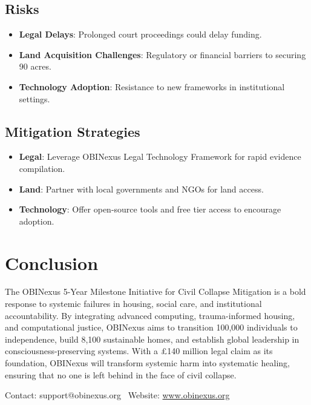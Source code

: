 \documentclass[12pt]{article}\usepackage[a4paper,margin=1in]{geometry}
\begin{document}
\subsection*{Risks}
\begin{itemize}
    \item \textbf{Legal Delays}: Prolonged court proceedings could delay funding.
    \item \textbf{Land Acquisition Challenges}: Regulatory or financial barriers to securing 90 acres.
    \item \textbf{Technology Adoption}: Resistance to new frameworks in institutional settings.
\end{itemize}\subsection*{Mitigation Strategies}
\begin{itemize}
    \item \textbf{Legal}: Leverage OBINexus Legal Technology Framework for rapid evidence compilation.
    \item \textbf{Land}: Partner with local governments and NGOs for land access.
    \item \textbf{Technology}: Offer open-source tools and free tier access to encourage adoption.
\end{itemize}\section*{Conclusion}
The OBINexus 5-Year Milestone Initiative for Civil Collapse Mitigation is a bold response to systemic failures in housing, social care, and institutional accountability. By integrating advanced computing, trauma-informed housing, and computational justice, OBINexus aims to transition 100,000 individuals to independence, build 8,100 sustainable homes, and establish global leadership in consciousness-preserving systems. With a £140 million legal claim as its foundation, OBINexus will transform systemic harm into systematic healing, ensuring that no one is left behind in the face of civil collapse.\begin{center}
    Contact: support@obinexus.org \
    Website: \href{http://obinexus.org}{www.obinexus.org}
\end{center}
\end{document}
